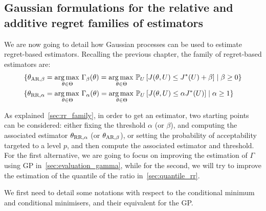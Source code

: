 \documentclass[../../Main_ManuscritThese.tex]{subfiles}
\begin{document}

\subsection{Gaussian formulations for the relative and additive regret families of estimators}
\label{ssec:gp_delta_alpha}

We are now going to detail how Gaussian processes can be used to
estimate regret-based estimators.  Recalling the previous chapter, the
family of regret-based estimators are:
\begin{align}
  \{ {\theta}_{\mathrm{AR,\beta}} &= \operatorname*{arg\,max \,}_{\theta\in\Theta} \Gamma_\beta(\theta) = \operatorname*{arg\,max \,}_{\theta\in\Theta} \mathbb{P}_{U}\left[J(\theta, U) \leq J^*(U) + \beta \right] \mid \beta \geq 0 \} \\
  \{ {\theta}_{\mathrm{RR,\alpha}} &= \operatorname*{arg\,max \,}_{\theta\in\Theta} \Gamma_\alpha(\theta) = \operatorname*{arg\,max \,}_{\theta\in\Theta}\mathbb{P}_{U}\left[J(\theta, U) \leq \alpha J^*(U)\right] \mid \alpha \geq 1 \}
\end{align}

As explained~\cref{sec:rr_family}, in order to get an estimator, two starting points can be considered: either fixing the threshold $\alpha$ (or $\beta$), and computing the associated estimator ${\theta}_{\mathrm{RR,\alpha}}$ (or ${\theta}_{\mathrm{AR,\beta}}$), or setting the probability of acceptability targeted to a level $p$, and then compute the associated estimator and threshold. For the first alternative, we are going to focus on improving the estimation of $\Gamma$ using GP in~\cref{sec:evaluation_gamma}, while for the second, we will try to improve the estimation of the quantile of the ratio in~\cref{sec:quantile_rr}.


We first need to detail some notations with respect to the conditional
minimum and conditional minimisers, and their equivalent for the GP.
\end{document}
